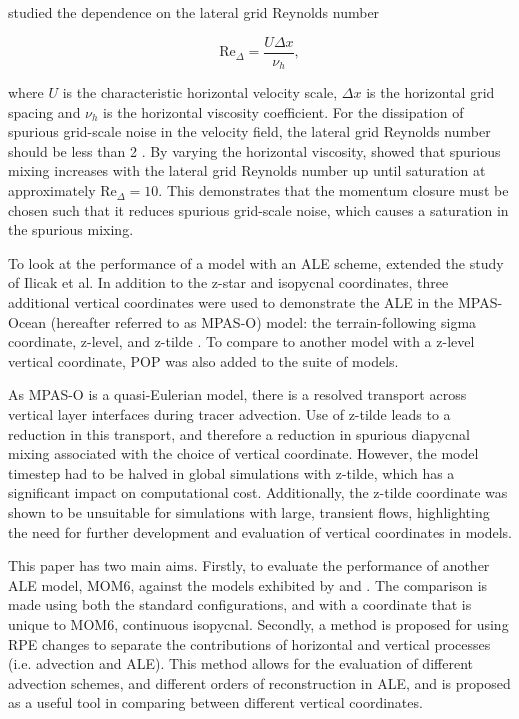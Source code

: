 \citet{ilicak12} studied the dependence on the lateral grid Reynolds number

\begin{equation}
  \mathrm{Re}_\Delta = \frac{U\Delta x}{\nu_h},
\end{equation}

where $U$ is the characteristic horizontal velocity scale, $\Delta x$ is the horizontal grid spacing and $\nu_h$ is the horizontal viscosity coefficient. For the dissipation of spurious grid-scale noise in the velocity field, the lateral grid Reynolds number should be less than 2 \citep[p.~410]{griffies04}. By varying the horizontal viscosity, \citet{ilicak12} showed that spurious mixing increases with the lateral grid Reynolds number up until saturation at approximately $\mathrm{Re}_\Delta = 10$. This demonstrates that the momentum closure must be chosen such that it reduces spurious grid-scale noise, which causes a saturation in the spurious mixing.


To look at the performance of a model with an ALE scheme, \citet{petersen15} extended the study of Ilicak et al. In addition to the z-star and isopycnal coordinates, three additional vertical coordinates were used to demonstrate the ALE in the MPAS-Ocean (hereafter referred to as MPAS-O) model: the terrain-following sigma coordinate, z-level, and z-tilde \citep{leclair11}. To compare to another model with a z-level vertical coordinate, POP was also added to the suite of models.

As MPAS-O is a quasi-Eulerian model, there is a resolved transport across vertical layer interfaces during tracer advection. Use of z-tilde leads to a reduction in this transport, and therefore a reduction in spurious diapycnal mixing associated with the choice of vertical coordinate. However, the model timestep had to be halved in global simulations with z-tilde, which has a significant impact on computational cost. Additionally, the z-tilde coordinate was shown to be unsuitable for simulations with large, transient flows, highlighting the need for further development and evaluation of vertical coordinates in models.

This paper has two main aims. Firstly, to evaluate the performance of another ALE model, MOM6, against the models exhibited by \citet{ilicak12} and \citet{petersen15}. The comparison is made using both the standard configurations, and with a coordinate that is unique to MOM6, continuous isopycnal. Secondly, a method is proposed for using RPE changes to separate the contributions of horizontal and vertical processes (i.e. advection and ALE). This method allows for the evaluation of different advection schemes, and different orders of reconstruction in ALE, and is proposed as a useful tool in comparing between different vertical coordinates.
